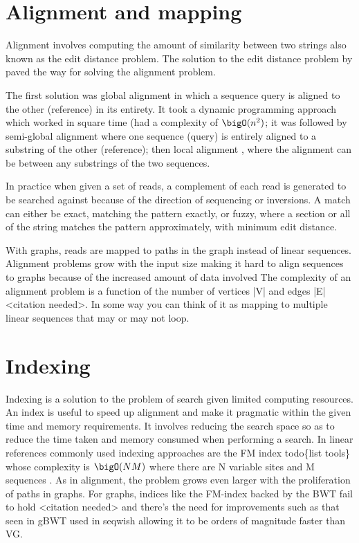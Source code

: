 \documentclass[11pt]{article}
\begin{document}
\section{Alignment and mapping}
\label{sec:orgc1e37e7}
Alignment involves computing the amount of similarity between two strings also 
known as the edit distance problem.
The solution to the edit distance problem by
\cite{levenshteinBinaryCodesCapable1966a} paved the way for solving the alignment
problem.

The first solution was global alignment
\cite{needlemanGeneralMethodApplicable1970} in which a sequence query is aligned
to the other (reference) in its entirety. It took a dynamic programming approach
which worked in square time (had a complexity of \(\bigO(n^2)\); it was followed
by semi-global alignment \cite{sellersTheoryComputationEvolutionary1980}
where one sequence (query) is entirely
aligned to a substring of the other (reference); then local alignment
\cite{smithIdentificationCommonMolecular1981}, where the alignment can be between 
any substrings of the two sequences.

In practice when given a set of reads, a complement of each read is generated to 
be searched against because of the direction of sequencing or inversions.
A match can either be exact, matching the pattern exactly, or fuzzy, where a 
section or all of the string matches the pattern approximately, with minimum 
edit distance.

With graphs, reads are mapped to paths in the graph instead of linear sequences.
Alignment problems grow with the input size
\cite{durbinEfficientHaplotypeMatching2014} making it hard to align sequences to
graphs  because of the increased amount of data involved
The complexity of an alignment problem is a function of the
number of  vertices |V| and edges |E| <citation needed>.  In some way you can
think of it as mapping to multiple linear sequences that may or may not loop.

\section{Indexing}
\label{sec:orgd35fe0e}
Indexing is a solution to the problem of search given limited computing
resources. An index is useful to speed up alignment and make it pragmatic within
the given time and memory requirements. 
It involves reducing the search space so as to reduce the time taken and memory
consumed when performing a search.
In linear references commonly used indexing approaches are the FM index 
todo\{list tools\} whose complexity is \(\bigO(NM)\) where there are N variable
sites and M sequences \cite{durbinEfficientHaplotypeMatching2014}.
As in alignment, the problem grows even larger with the proliferation of paths 
in graphs. For graphs, indices like the FM-index backed by the BWT fail to hold
<citation needed> and there’s the need for improvements such as that seen in
gBWT used in seqwish allowing it to be orders of magnitude faster than VG.
\end{document}
